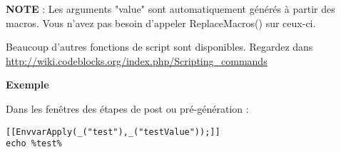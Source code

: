 \textbf{NOTE} : Les arguments "value" sont automatiquement générés à partir des macros. Vous n'avez pas besoin d'appeler ReplaceMacros() sur ceux-ci.

Beaucoup d'autres fonctions de script sont disponibles. Regardez dans \url{http://wiki.codeblocks.org/index.php/Scripting_commands}

\textbf{Exemple}

Dans les fenêtres des étapes de post ou pré-génération :
\begin{lstlisting}
[[EnvvarApply(_("test"),_("testValue"));]]
echo %test%
\end{lstlisting}

